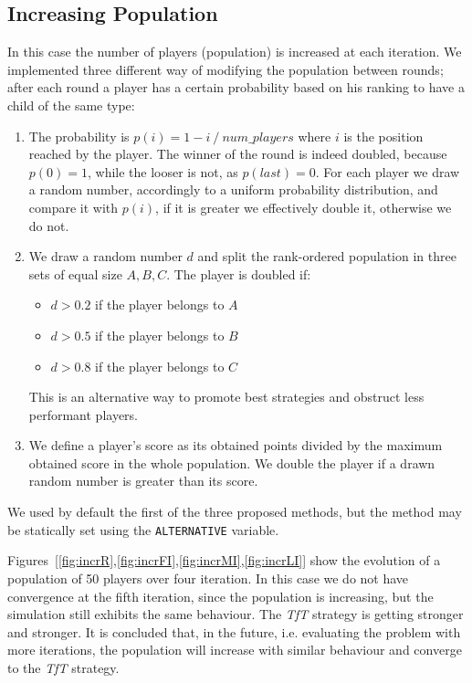 \documentclass[journal,a4paper,10pt,twoside]{IEEEtran} %
\begin{document}
\subsection{Increasing Population}
In this case the number of players (population) is increased at each iteration. We implemented three different way of modifying the population between rounds; after each round a player has a certain probability based on his ranking to have a child of the same type:
\begin{enumerate}
    \item The probability is $p(i)=1- i\ /\ num\_players$ where $i$ is the position reached by the player. The winner of the round is indeed doubled, because $p(0)=1$, while the looser is not, as $p(last)=0$.
    For each player we draw a random number, accordingly to a uniform probability distribution, and compare it with $p(i)$, if it is greater we effectively double it, otherwise we do not.
    \item We draw a random number $d$ and split the rank-ordered population in three sets of equal size $A,B,C$. The player is doubled if:
    \begin{itemize}
        \item $d>0.2$ if the player belongs to $A$
        \item $d>0.5$ if the player belongs to $B$
        \item $d>0.8$ if the player belongs to $C$        
    \end{itemize}
    This is an alternative way to promote best strategies and obstruct less performant players.
    \item We define a player's score as its obtained points divided by the maximum obtained score in the whole population. We double the player if a drawn random number is greater than its score.
\end{enumerate}

We used by default the first of the three proposed methods, but the method may be statically set using the \texttt{ALTERNATIVE} variable.

Figures~[\ref{fig:incrR},\ref{fig:incrFI},\ref{fig:incrMI},\ref{fig:incrLI}] show the evolution of a population of 50 players over four iteration. In this case we do not have convergence at the fifth iteration, since the population is increasing, but the simulation still exhibits the same behaviour. The \textit{TfT} strategy is getting stronger and stronger. It is concluded that, in the future, i.e. evaluating the problem with more iterations, the population will increase with similar behaviour and converge to the \textit{TfT} strategy.
\end{document}

